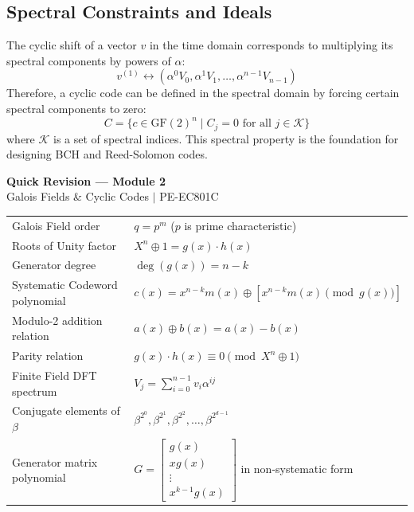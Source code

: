 \documentclass[12pt,a4paper]{article}
\renewcommand{\arraystretch}{1.45}
\begin{document}
\subsection{Spectral Constraints and Ideals}
The cyclic shift of a vector $v$ in the time domain corresponds to multiplying its spectral components by powers of $\alpha$:
\[ v^{(1)} \longleftrightarrow (\alpha^0 V_0, \alpha^1 V_1, \dots, \alpha^{n-1} V_{n-1}) \]
Therefore, a cyclic code can be defined in the spectral domain by forcing certain spectral components to zero:
\[ C = \{ c \in \text{GF}(2)^n \mid C_j = 0 \text{ for all } j \in \mathcal{K} \} \]
where $\mathcal{K}$ is a set of spectral indices. This spectral property is the foundation for designing BCH and Reed-Solomon codes.

\newpage
\begin{center}
  {\large\bfseries\color{myred} Quick Revision --- Module 2}\\[3pt]
  {\small\color{mydark} Galois Fields \& Cyclic Codes $|$ PE-EC801C}
\end{center}
\noindent{\color{myred}\rule{\linewidth}{1.2pt}}
\vspace{4pt}

\begin{tcolorbox}[formulabox, title={\textbf{Key Formulas and Metrics at a Glance}}]
\renewcommand{\arraystretch}{1.35}
\begin{tabularx}{\linewidth}{B{5.0cm} X}
Galois Field order & $q = p^m$ ($p$ is prime characteristic) \\[4pt]
Roots of Unity factor & $X^n \oplus 1 = g(x) \cdot h(x)$ \\[4pt]
Generator degree & $\deg(g(x)) = n - k$ \\[4pt]
Systematic Codeword polynomial & $c(x) = x^{n-k}m(x) \oplus [x^{n-k}m(x) \pmod{g(x)}]$ \\[4pt]
Modulo-2 addition relation & $a(x) \oplus b(x) = a(x) - b(x)$ \\[4pt]
Parity relation & $g(x) \cdot h(x) \equiv 0 \pmod{X^n \oplus 1}$ \\[4pt]
Finite Field DFT spectrum & $V_j = \sum_{i=0}^{n-1} v_i \alpha^{ij}$ \\[4pt]
Conjugate elements of $\beta$ & $\beta^{2^0}, \beta^{2^1}, \beta^{2^2}, \dots, \beta^{2^{d-1}}$ \\[4pt]
Generator matrix polynomial & $G = \begin{bmatrix} g(x) \\ x g(x) \\ \vdots \\ x^{k-1}g(x) \end{bmatrix}$ in non-systematic form
\end{tabularx}
\end{tcolorbox}
\end{document}
